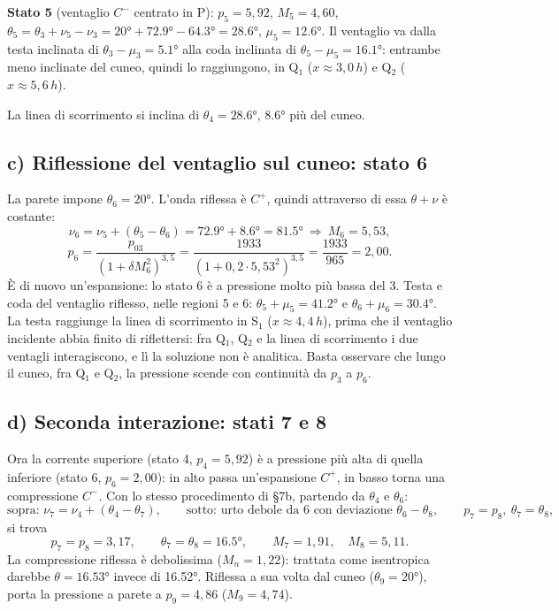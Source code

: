 \documentclass[11pt,a4paper]{article}
\newcommand{\Cp}{C^{+}}
\newcommand{\Cm}{C^{-}}
\begin{document}
\textbf{Stato 5} (ventaglio $\Cm$ centrato in P): $p_5=5{,}92$, $M_5=4{,}60$, $\theta_5=\theta_3+\nu_5-\nu_3=
\ang{20}+\ang{72.9}-\ang{64.3}=\ang{28.6}$, $\mu_5=\ang{12.6}$. Il ventaglio va dalla testa inclinata di
$\theta_3-\mu_3=\ang{5.1}$ alla coda inclinata di $\theta_5-\mu_5=\ang{16.1}$: entrambe meno inclinate del cuneo, quindi
lo raggiungono, in Q$_1$ ($x\approx3{,}0\,h$) e Q$_2$ ($x\approx5{,}6\,h$).

La linea di scorrimento si inclina di $\theta_4=\ang{28.6}$, \ang{8.6} più del cuneo.

\subsection*{c) Riflessione del ventaglio sul cuneo: stato 6}
La parete impone $\theta_6=\ang{20}$. L'onda riflessa è $\Cp$, quindi attraverso di essa $\theta+\nu$ è costante:
\[
\nu_6=\nu_5+(\theta_5-\theta_6)=\ang{72.9}+\ang{8.6}=\ang{81.5}\ \Rightarrow\ M_6=5{,}53,
\]
\[
p_6=\frac{p_{03}}{(1+\delta M_6^2)^{3{,}5}}=\frac{1933}{(1+0{,}2\cdot5{,}53^2)^{3{,}5}}=\frac{1933}{965}=2{,}00 .
\]
È di nuovo un'espansione: lo stato 6 è a pressione molto più bassa del 3. Testa e coda del ventaglio riflesso,
nelle regioni 5 e 6: $\theta_5+\mu_5=\ang{41.2}$ e $\theta_6+\mu_6=\ang{30.4}$. La testa raggiunge la linea di
scorrimento in S$_1$ ($x\approx4{,}4\,h$), prima che il ventaglio incidente abbia finito di riflettersi: fra Q$_1$,
Q$_2$ e la linea di scorrimento i due ventagli interagiscono, e lì la soluzione non è analitica. Basta osservare che
lungo il cuneo, fra Q$_1$ e Q$_2$, la pressione scende con continuità da $p_3$ a $p_6$.

\subsection*{d) Seconda interazione: stati 7 e 8}
Ora la corrente superiore (stato 4, $p_4=5{,}92$) è a pressione più alta di quella inferiore (stato 6, $p_6=2{,}00$):
in alto passa un'espansione $\Cp$, in basso torna una compressione $\Cm$. Con lo stesso procedimento di §7b,
partendo da $\theta_4$ e $\theta_6$:
\[
\text{sopra: } \nu_7=\nu_4+(\theta_4-\theta_7),\qquad
\text{sotto: urto debole da 6 con deviazione } \theta_6-\theta_8,\qquad p_7=p_8,\ \theta_7=\theta_8,
\]
si trova
\[
p_7=p_8=3{,}17,\qquad \theta_7=\theta_8=\ang{16.5},\qquad M_7=1{,}91,\quad M_8=5{,}11 .
\]
La compressione riflessa è debolissima ($M_n=1{,}22$): trattata come isentropica darebbe $\theta=\ang{16.53}$ invece di
\ang{16.52}. Riflessa a sua volta dal cuneo ($\theta_9=\ang{20}$), porta la pressione a parete a $p_9=4{,}86$
($M_9=4{,}74$).
\end{document}
